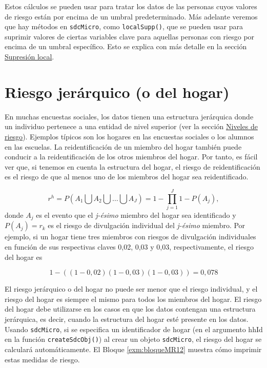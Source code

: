 \documentclass[
]{book}
\newenvironment{Shaded}{\begin{snugshade}}{\end{snugshade}}
\newcommand{\DecValTok}[1]{\textcolor[rgb]{0.00,0.00,0.81}{#1}}
\newcommand{\FloatTok}[1]{\textcolor[rgb]{0.00,0.00,0.81}{#1}}
\newcommand{\FunctionTok}[1]{\textcolor[rgb]{0.00,0.00,0.00}{#1}}
\newcommand{\NormalTok}[1]{#1}
\newcommand{\SpecialCharTok}[1]{\textcolor[rgb]{0.00,0.00,0.00}{#1}}
\theoremstyle{definition}
\theoremstyle{definition}
\theoremstyle{definition}
\theoremstyle{definition}
\theoremstyle{remark}
\begin{document}
\begin{Shaded}
\end{Shaded}

Estos cálculos se pueden usar para tratar los datos de las personas cuyos valores de riesgo están por encima de un umbral predeterminado. Más adelante veremos que hay métodos en \texttt{sdcMicro}, como \texttt{localSupp()}, que se pueden usar para suprimir valores de ciertas variables clave para aquellas personas con riesgo por encima de un umbral específico. Esto se explica con más detalle en la sección \protect\hyperlink{sup-loc}{Supresión local}.

\hypertarget{riesgo-jeruxe1rquico-o-del-hogar}{%
\section{Riesgo jerárquico (o del hogar)}\label{riesgo-jeruxe1rquico-o-del-hogar}}

En muchas encuestas sociales, los datos tienen una estructura jerárquica donde un individuo pertenece a una entidad de nivel superior (ver la sección \protect\hyperlink{niveles-de-riesgo}{Niveles de riesgo}). Ejemplos típicos son los hogares en las encuestas sociales o los alumnos en las escuelas. La reidentificación de un miembro del hogar también puede conducir a la reidentificación de los otros miembros del hogar. Por tanto, es fácil ver que, si tenemos en cuenta la estructura del hogar, el riesgo de reidentificación es el riesgo de que al menos uno de los miembros del hogar sea reidentificado.

\[r^h=P(A_{1}\bigcup A_{2}\bigcup \dots \bigcup A_{J})=1-\prod_{j=1}^J 1-P(A_{j}), \]
donde \(A_{j}\) es el evento que el \emph{j-ésimo} miembro del hogar sea identificado y \(P(A_{j})=r_{k}\) es el riesgo de divulgación individual del \emph{j-ésimo} miembro. Por ejemplo, si un hogar tiene tres miembros con riesgos de divulgación individuales en función de sus respectivas claves 0,02, 0,03 y 0,03, respectivamente, el riesgo del hogar es

\[1-((1-0,02)(1-0,03)(1-0,03))=0,078\]

El riesgo jerárquico o del hogar no puede ser menor que el riesgo individual, y el riesgo del hogar es siempre el mismo para todos los miembros del hogar. El riesgo del hogar debe utilizarse en los casos en que los datos contengan una estructura jerárquica, es decir, cuando la estructura del hogar esté presente en los datos. Usando \texttt{sdcMicro}, si se especifica un identificador de hogar (en el argumento hhId en la función \texttt{createSdcObj()}) al crear un objeto \texttt{sdcMicro}, el riesgo del hogar se calculará automáticamente. El Bloque \ref{exm:bloqueMR12} muestra cómo imprimir estas medidas de riesgo.
\end{document}
